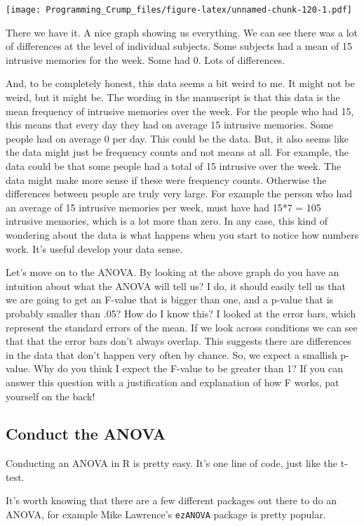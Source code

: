 \documentclass[]{book}
\theoremstyle{definition}
\theoremstyle{definition}
\theoremstyle{definition}
\theoremstyle{remark}
\begin{document}
\texttt{[image: Programming\_Crump\_files/figure-latex/unnamed-chunk-120-1.pdf]}

There we have it. A nice graph showing us everything. We can see there
was a lot of differences at the level of individual subjects. Some
subjects had a mean of 15 intrusive memories for the week. Some had 0.
Lots of differences.

And, to be completely honest, this data seems a bit weird to me. It
might not be weird, but it might be. The wording in the manuscript is
that this data is the mean frequency of intrusive memories over the
week. For the people who had 15, this means that every day they had on
average 15 intrusive memories. Some people had on average 0 per day.
This could be the data. But, it also seems like the data might just be
frequency counts and not means at all. For example, the data could be
that some people had a total of 15 intrusive over the week. The data
might make more sense if these were frequency counts. Otherwise the
differences between people are truly very large. For example the person
who had an average of 15 intrusive memories per week, must have had 15*7
= 105 intrusive memories, which is a lot more than zero. In any case,
this kind of wondering about the data is what happens when you start to
notice how numbers work. It's useful develop your data sense.

Let's move on to the ANOVA. By looking at the above graph do you have an
intuition about what the ANOVA will tell us? I do, it should easily tell
us that we are going to get an F-value that is bigger than one, and a
p-value that is probably smaller than .05? How do I know this? I looked
at the error bars, which represent the standard errors of the mean. If
we look across conditions we can see that that the error bars don't
always overlap. This suggests there are differences in the data that
don't happen very often by chance. So, we expect a smallish p-value. Why
do you think I expect the F-value to be greater than 1? If you can
answer this question with a justification and explanation of how F
works, pat yourself on the back!

\subsection{Conduct the ANOVA}\label{conduct-the-anova}

Conducting an ANOVA in R is pretty easy. It's one line of code, just
like the t-test.

It's worth knowing that there are a few different packages out there to
do an ANOVA, for example Mike Lawrence's \texttt{ezANOVA} package is
pretty popular.
\end{document}
